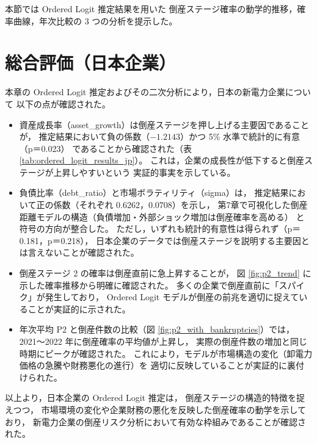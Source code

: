 本節では Ordered Logit 推定結果を用いた
倒産ステージ確率の動学的推移，確率曲線，年次比較の 3 つの分析を提示した。


\section{総合評価（日本企業）}

本章の Ordered Logit 推定およびその二次分析により，日本の新電力企業について
以下の点が確認された。

\begin{itemize}
    \item 資産成長率（asset\_growth）は倒産ステージを押し上げる主要因であることが，
          推定結果において負の係数（$-1.2143$）かつ 5\% 水準で統計的に有意（p＝0.023）
          であることから確認された（表 \ref{tab:ordered_logit_results_jp}）。
          これは，企業の成長性が低下すると倒産ステージが上昇しやすいという
          実証的事実を示している。

    \item 負債比率（debt\_ratio）と市場ボラティリティ（sigma）は，
          推定結果において正の係数（それぞれ 0.6262，0.0708）を示し，
          第7章で可視化した倒産距離モデルの構造（負債増加・外部ショック増加は倒産確率を高める）
          と符号の方向が整合した。
          ただし，いずれも統計的有意性は得られず（p＝0.181，p＝0.218），
          日本企業のデータでは倒産ステージを説明する主要因とは言えないことが確認された。

    \item 倒産ステージ 2 の確率は倒産直前に急上昇することが，
          図 \ref{fig:p2_trend} に示した確率推移から明確に確認された。
          多くの企業で倒産直前に「スパイク」が発生しており，
          Ordered Logit モデルが倒産の前兆を適切に捉えていることが実証的に示された。

    \item 年次平均 P2 と倒産件数の比較（図 \ref{fig:p2_with_bankruptcies}）では，
          2021～2022 年に倒産確率の平均値が上昇し，
          実際の倒産件数の増加と同じ時期にピークが確認された。
          これにより，モデルが市場構造の変化（卸電力価格の急騰や財務悪化の進行）を
          適切に反映していることが実証的に裏付けられた。
\end{itemize}

以上より，日本企業の Ordered Logit 推定は，
倒産ステージの構造的特徴を捉えつつ，
市場環境の変化や企業財務の悪化を反映した倒産確率の動学を示しており，
新電力企業の倒産リスク分析において有効な枠組みであることが確認された。


